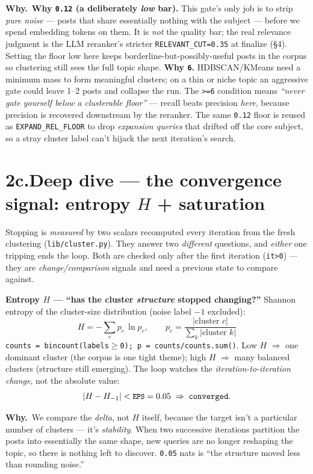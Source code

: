 \documentclass[11pt,a4paper]{article}
\newcommand{\why}[1]{%
  \par\vspace{2pt}%
  \noindent\colorbox{mist}{\begin{minipage}{\dimexpr\linewidth-2\fboxsep}%
  \textcolor{accent2}{\textbf{Why.}}~#1\end{minipage}}\par\vspace{3pt}}
\newcommand{\code}[1]{\texttt{\small #1}}
\begin{document}
\why{\textbf{Why \code{0.12} (a deliberately \emph{low} bar).} This gate's only job is to strip
\emph{pure noise} --- posts that share essentially nothing with the subject --- before we spend
embedding tokens on them. It is \emph{not} the quality bar; the real relevance judgment is the
LLM reranker's stricter \code{RELEVANT\_CUT=0.35} at finalize (\S4). Setting the floor low here
keeps borderline-but-possibly-useful posts in the corpus so clustering still sees the full topic
shape. \textbf{Why \code{6}.} HDBSCAN/KMeans need a minimum mass to form meaningful clusters;
on a thin or niche topic an aggressive gate could leave 1--2 posts and collapse the run. The
\code{>=6} condition means \emph{``never gate yourself below a clusterable floor''} --- recall
beats precision \emph{here}, because precision is recovered downstream by the reranker. The same
\code{0.12} floor is reused as \code{EXPAND\_REL\_FLOOR} to drop \emph{expansion queries} that
drifted off the core subject, so a stray cluster label can't hijack the next iteration's search.}

\section*{2c.\quad Deep dive --- the convergence signal: entropy $H$ + saturation}

Stopping is \emph{measured} by two scalars recomputed every iteration from the fresh clustering
(\code{lib/cluster.py}). They answer two \emph{different} questions, and \emph{either} one
tripping ends the loop. Both are checked only after the first iteration (\code{it>0}) --- they
are \emph{change/comparison} signals and need a previous state to compare against.

\smallskip
\noindent\textbf{Entropy $H$ --- ``has the cluster \emph{structure} stopped changing?''}
Shannon entropy of the cluster-size distribution (noise label $-1$ excluded):
\[
H=-\sum_{c} p_c\,\ln p_c,\qquad p_c=\frac{|\text{cluster }c|}{\sum_k|\text{cluster }k|}
\]
\code{counts = bincount(labels$\ge$0); p = counts/counts.sum()}. Low $H$ $\Rightarrow$ one
dominant cluster (the corpus is one tight theme); high $H$ $\Rightarrow$ many balanced clusters
(structure still emerging). The loop watches the \emph{iteration-to-iteration change}, not the
absolute value:
\[
|H - H_{-1}| < \text{\code{EPS}}=0.05 \;\Rightarrow\; \texttt{converged}.
\]
\why{We compare the \emph{delta}, not $H$ itself, because the target isn't a particular number
of clusters --- it's \emph{stability}. When two successive iterations partition the posts into
essentially the same shape, new queries are no longer reshaping the topic, so there is nothing
left to discover. \code{0.05} nats is ``the structure moved less than rounding noise.''}
\end{document}

